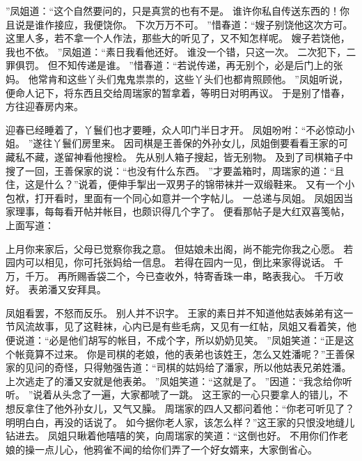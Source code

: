 ”凤姐道：“这个自然要问的，只是真赏的也有不是。
谁许你私自传送东西的！你且说是谁作接应，我便饶你。
下次万万不可。
”惜春道：“嫂子别饶他这次方可。
这里人多，若不拿一个人作法，那些大的听见了，又不知怎样呢。
嫂子若饶他，我也不依。
”凤姐道：“素日我看他还好。
谁没一个错，只这一次。
二次犯下，二罪俱罚。
但不知传递是谁。
”惜春道：“若说传递，再无别个，必是后门上的张妈。
他常肯和这些丫头们鬼鬼祟祟的，这些丫头们也都肯照顾他。
”凤姐听说，便命人记下，将东西且交给周瑞家的暂拿着，等明日对明再议。
于是别了惜春，方往迎春房内来。
\par
迎春已经睡着了，丫鬟们也才要睡，众人叩门半日才开。
凤姐吩咐：“不必惊动小姐。
”遂往丫鬟们房里来。
因司棋是王善保的外孙女儿，凤姐倒要看看王家的可藏私不藏，遂留神看他搜检。
先从别人箱子搜起，皆无别物。
及到了司棋箱子中搜了一回，王善保家的说：“也没有什么东西。
”才要盖箱时，周瑞家的道：“且住，这是什么？”说着，便伸手掣出一双男子的锦带袜并一双缎鞋来。
又有一个小包袱，打开看时，里面有一个同心如意并一个字帖儿。
一总递与凤姐。
凤姐因当家理事，每每看开帖并帐目，也颇识得几个字了。
便看那帖子是大红双喜笺帖，上面写道：\par
\hop
上月你来家后，父母已觉察你我之意。
但姑娘未出阁，尚不能完你我之心愿。
若园内可以相见，你可托张妈给一信息。
若得在园内一见，倒比来家得说话。
千万，千万。
再所赐香袋二个，今已查收外，特寄香珠一串，略表我心。
千万收好。
表弟潘又安拜具。
\par
\hop
凤姐看罢，不怒而反乐。
别人并不识字。
王家的素日并不知道他姑表姊弟有这一节风流故事，见了这鞋袜，心内已是有些毛病，又见有一红帖，凤姐又看着笑，他便说道：“必是他们胡写的帐目，不成个字，所以奶奶见笑。
”凤姐笑道：“正是这个帐竟算不过来。
你是司棋的老娘，他的表弟也该姓王，怎么又姓潘呢？”王善保家的见问的奇怪，只得勉强告道：“司棋的姑妈给了潘家，所以他姑表兄弟姓潘。
上次逃走了的潘又安就是他表弟。
”凤姐笑道：“这就是了。
”因道：“我念给你听听。
”说着从头念了一遍，大家都唬了一跳。
这王家的一心只要拿人的错儿，不想反拿住了他外孙女儿，又气又臊。
周瑞家的四人又都问着他：“你老可听见了？明明白白，再没的话说了。
如今据你老人家，该怎么样？”这王家的只恨没地缝儿钻进去。
凤姐只瞅着他嘻嘻的笑，向周瑞家的笑道：“这倒也好。
不用你们作老娘的操一点儿心，他鸦雀不闻的给你们弄了一个好女婿来，大家倒省心。
